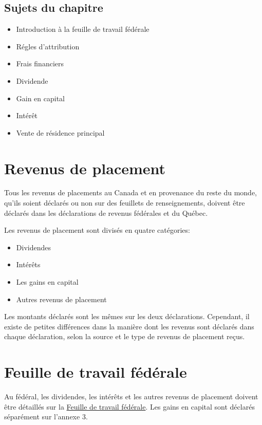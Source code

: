 \subsection{Sujets du chapitre}
\begin{itemize}
	\item Introduction à la feuille de travail fédérale
	\item Régles d'attribution
	\item Frais financiers
	\item Dividende
	\item Gain en capital
	\item Intérêt
	\item Vente de résidence principal
\end{itemize}



\section{Revenus de placement}
\begin{intro}
	Tous les revenus de placements au Canada et en provenance du reste du monde, qu'ils soient déclarés ou non sur des feuillets de renseignements, doivent être déclarés dans les déclarations de revenus fédérales et du Québec.
\end{intro}
Les revenus de placement sont divisés en quatre catégories:
\begin{itemize}
	\item Dividendes
	\item Intérêts
	\item Les gains en capital
	\item Autres revenus de placement
\end{itemize}

Les montants déclarés sont les mêmes sur les deux déclarations. Cependant, il existe de petites différences dans la manière dont les revenus sont déclarés dans chaque déclaration, selon la source et le type de revenus de placement reçus.



\section{Feuille de travail fédérale}
Au fédéral, les dividendes, les intérêts et les autres revenus de placement doivent être détaillés sur la \href{https://www.canada.ca/fr/agence-revenu/services/formulaires-publications/trousses-impot-toutes-annees-imposition/trousse-generale-impot-prestations/5000-d1.html}{Feuille de travail fédérale}. Les gains en capital sont déclarés séparément sur l'annexe 3.

